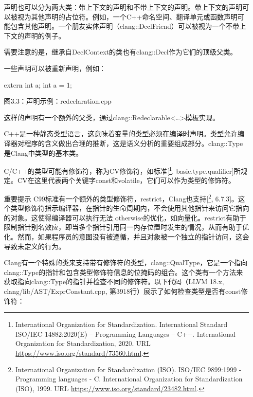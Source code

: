 

声明也可以分为两大类：带上下文的声明和不带上下文的声明。带上下文的声明可以被视为其他声明的占位符。例如，一个C++命名空间、翻译单元或函数声明可能包含其他声明。一个朋友实体声明（clang::DeclFriend）可以被视为一个不带上下文的声明的例子。

需要注意的是，继承自DeclContext的类也有clang::Decl作为它们的顶级父类。

一些声明可以被重新声明，例如：

\begin{cpp}
extern int a;
int a = 1;
\end{cpp}

\begin{center}
图3.3：声明示例：redeclaration.cpp
\end{center}

这样的声明有一个额外的父类，通过clang::Redeclarable<…>模板实现。


C++是一种静态类型语言，这意味着变量的类型必须在编译时声明。类型允许编译器对程序的含义做出合理的推断，这是语义分析的重要组成部分。clang::Type是Clang中类型的基本类。

C/C++的类型可能有修饰符，称为CV修饰符，如标准[\footnote{International Organization for Standardization. International Standard ISO/IEC 14882:2020(E) – Programming Languages – C++. International Organization for Standardization, 2020. URL \url{https://www.iso.org/standard/73560.html}.}, basic.type.qualifier]所规定。CV在这里代表两个关键字const和volatile，它们可以作为类型的修饰符。

\begin{myNotic}{重要提示}
C99标准有一个额外的类型修饰符，restrict，Clang也支持[\footnote{International Organization for Standardization (ISO). ISO/IEC 9899:1999 - Programming languages - C. International Organization for Standardization (ISO), 1999. URL \url{https://www.iso.org/standard/23482.html}.}, 6.7.3]。这个类型修饰符指示编译器，在指针的生命周期内，不会使用其他指针来访问它指向的对象。这使得编译器可以执行无法 otherwise的优化，如向量化。restrict有助于限制指针别名效应，即当多个指针引用同一内存位置时发生的情况，从而有助于优化。然而，如果程序员的意图没有被遵循，并且对象被一个独立的指针访问，这会导致未定义的行为。
\end{myNotic}

Clang有一个特殊的类来支持带有修饰符的类型，clang::QualType，它是一个指向clang::Type的指针和包含类型修饰符信息的位掩码的组合。这个类有一个方法来获取指向clang::Type的指针并检查不同的修饰符。以下代码（LLVM 18.x, clang/lib/AST/ExprConstant.cpp, 第3918行）展示了如何检查类型是否有const修饰符：

